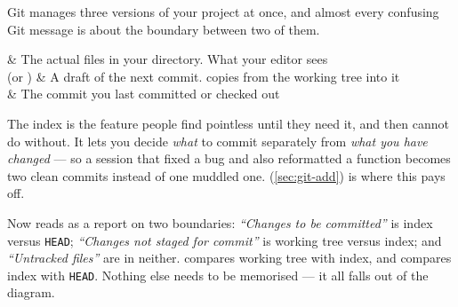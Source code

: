 Git manages three versions of your project at once, and almost every confusing
Git message is about the boundary between two of them.

\begin{center}
\end{center}

\begin{keys}[0.24]
	 & The actual files in your directory. What your editor sees \\
	 (or ) & A draft of the next commit.  copies from the working tree into it \\
	         & The commit you last committed or checked out             \\
\end{keys}

\begin{intuition}
	The index is the feature people find pointless until they need it, and then
	cannot do without. It lets you decide \emph{what} to commit separately from
	\emph{what you have changed} --- so a session that fixed a bug and also
	reformatted a function becomes two clean commits instead of one muddled one.
	 (\autoref{sec:git-add}) is where this pays off.
\end{intuition}

\begin{note}
	Now  reads as a report on two boundaries:
	\emph{``Changes to be committed''} is index versus \texttt{HEAD};
	\emph{``Changes not staged for commit''} is working tree versus index; and
	\emph{``Untracked files''} are in neither.  compares working tree
	with index, and  compares index with \texttt{HEAD}.
	Nothing else needs to be memorised --- it all falls out of the diagram.
\end{note}

